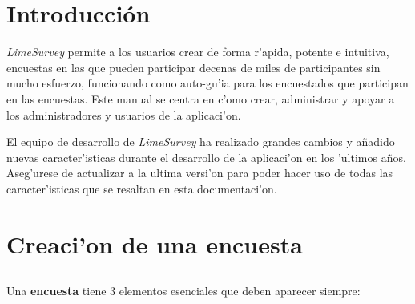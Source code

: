 \documentclass[12pt,spanish]{report}
\begin{document}
\doublespacing
{}
\tableofcontents
\newpage

\chapter{Introducci\'on}
\newpage

\emph{LimeSurvey} permite a los usuarios crear de forma r'apida, potente e intuitiva, encuestas en las que pueden participar decenas de miles de participantes sin mucho esfuerzo, funcionando como auto-gu'ia para los encuestados que participan en las encuestas. Este manual se centra en c'omo crear, administrar y apoyar a los administradores y usuarios de la aplicaci'on.

El equipo de desarrollo de \emph{LimeSurvey} ha realizado grandes cambios y añadido nuevas caracter'isticas durante el desarrollo de la aplicaci'on en los 'ultimos años. Aseg'urese de actualizar a la ultima versi'on para poder hacer uso de todas las caracter'isticas que se resaltan en esta documentaci'on.


\newpage

\chapter{Creaci'on de una encuesta}
\newpage

\section{}
Una {\bf encuesta} tiene 3 elementos esenciales que deben aparecer siempre:
\end{document}
